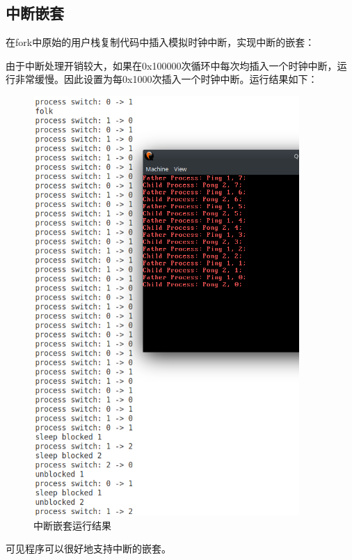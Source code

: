 \documentclass[12pt,a4paper,UTF8]{article}
\begin{document}
\newpage
\subsection{中断嵌套}
在fork中原始的用户栈复制代码中插入模拟时钟中断，实现中断的嵌套：

由于中断处理开销较大，如果在0x100000次循环中每次均插入一个时钟中断，运行非常缓慢。因此设置为每0x1000次插入一个时钟中断。运行结果如下：
\begin{figure}[htbp]
	\centering
	\includegraphics[width=0.9\textwidth]{multi}
	\caption{中断嵌套运行结果}
\end{figure}
\newpage
可见程序可以很好地支持中断的嵌套。
\end{document}
